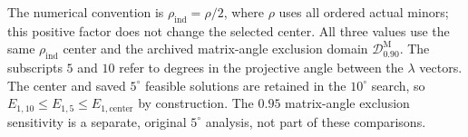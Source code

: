 \documentclass[12pt,letterpaper]{article}
\theoremstyle{plain}
\theoremstyle{definition}
\begin{document}
\begin{table}[p]
\par\medskip
\begin{minipage}{0.96\linewidth}\footnotesize
The numerical convention is $\rho_{\mathrm{ind}}=\rho/2$, where $\rho$ uses all ordered actual minors; this positive factor does not change the selected center. All three values use the same $\rho_{\mathrm{ind}}$ center and the archived matrix-angle exclusion domain $\mathcal D^{\mathrm M}_{0.90}$. The subscripts $5$ and $10$ refer to degrees in the projective angle between the $\lambda$ vectors. The center and saved $5^\circ$ feasible solutions are retained in the $10^\circ$ search, so $E_{1,10}\le E_{1,5}\le E_{1,\mathrm{center}}$ by construction. The $0.95$ matrix-angle exclusion sensitivity is a separate, original $5^\circ$ analysis, not part of these comparisons.
\end{minipage}
\endgroup
\end{table}
\end{document}
